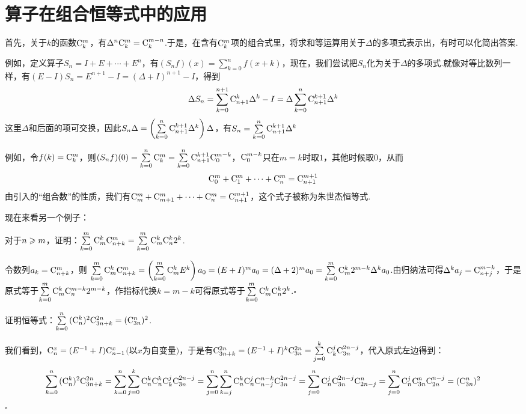 \documentclass[10pt]{article}
\newcommand*{\QEDB}{\hfill\ensuremath{\square}}  %
\newcommand*{\SL}{\sum\limits}
\newcommand*{\rC}{{\rm C}}
\numberwithin{equation}{section}
\begin{document}
\section{算子在组合恒等式中的应用} \label{s:1}
首先，关于$k$的函数$\rC_k^m$，有$\Delta^n \rC_k^m = \rC_k^{m-n}$.于是，在含有$\rC_k^m$项的组合式里，将求和等运算用关于$\Delta$的多项式表示出，有时可以化简出答案.
\par 例如，定义算子$S_n = I + E + \cdots + E^n$，有$(S_nf)(x) = \SL_{k=0}^{n}f(x+k)$，现在，我们尝试把$S_n$化为关于$\Delta$的多项式.就像对等比数列一样，有$(E-I)S_n = E^{n+1}-I = (\Delta + I)^{n+1} - I$，得到
\[
    \Delta S_n = \sum_{k=0}^{n+1}{\rC_{n+1}^k \Delta^k}-I = \Delta\sum_{k=0}^{n}{\rC_{n+1}^{k+1}\Delta^{k}}
\]
这里$\Delta$和后面的项可交换，因此$S_n\Delta = \left(\SL_{k=0}^{n}{\rC_{n+1}^{k+1}}\Delta^k\right)\Delta$，有$S_n = \SL_{k=0}^{n}{\rC_{n+1}^{k+1}}\Delta^k$
\par 例如，令$f(k) = \rC_{k}^{m}$，则$(S_nf)(0) = \SL_{k=0}^{n}{\rC_{k}^{m}} = \SL_{k=0}^{n}{\rC_{n+1}^{k+1}\rC_{0}^{m-k}}$，$\rC_{0}^{m-k}$只在$m = k$时取$1$，其他时候取$0$，从而
$$
\rC_{0}^{m} + \rC_{1}^{m} + \cdots + \rC_{n}^{m} = \rC_{n+1}^{m+1}
$$
由引入的“组合数”的性质，我们有$\rC_{m}^{m} + \rC_{m+1}^{m} + \cdots + \rC_{n}^{m} = \rC_{n+1}^{m+1}$，这个式子被称为{\zhht 朱世杰恒等式}.
\par 现在来看另一个例子：
\begin{LT}
    对于$n \geqslant m$，证明：$\SL_{k=0}^{m}{\rC_{m}^{k}\rC_{n+k}^m} = \SL_{k=0}^{m}{\rC_{m}^k \rC_n^k2^k}$.
\end{LT}
\begin{ZM}
令数列$a_k = \rC_{n+k}^m$，则 $\SL_{k=0}^{m}{\rC_{m}^{k}\rC_{n+k}^m} = \left(\SL_{k=0}^{m}{\rC_{m}^{k}E^k}\right)a_0 = (E+I)^ma_0 = (\Delta+2)^ma_0 = \SL_{k=0}^{m}{\rC_{m}^{k}2^{m-k}\Delta^k}a_0$.由归纳法可得$\Delta^ka_j = \rC_{n+j}^{m-k}$，于是原式等于$\SL_{k=0}^{m}{\rC_{m}^k\rC_{n}^{m-k}2^{m-k}}$，作指标代换$k = m-k$可得原式等于$\SL_{k=0}^{m}\rC_{m}^{k}\rC_{n}^{k}2^k$.\QEDB
\end{ZM}
\begin{LT}
    证明恒等式：$\SL_{k=0}^{n}{(\rC_n^k)^2\rC_{3n+k}^{2n}} = (\rC_{3n}^n)^2$.
\end{LT}
\begin{ZM}
    我们看到，$\rC_{n}^{x} = (E^{-1}+I)\rC_{n-1}^{x}$$($以$x$为自变量$)$，于是有$\rC_{3n+k}^{2n} = (E^{-1}+I)^{k}\rC_{3n}^{2n} = \SL_{j=0}^{k}{\rC_{k}^j\rC_{3n}^{2n-j}}$，代入原式左边得到：
    \[
        \sum_{k=0}^{n}{(\rC_n^k)^2\rC_{3n+k}^{2n}} = \sum_{k=0}^{n}\sum_{j=0}^{k}{\rC_n^k\rC_{n}^k\rC_{k}^{j}\rC_{3n}^{2n-j}} = \sum_{j=0}^{n}\sum_{k=j}^{n}{\rC_{n}^{k}\rC_{n}^{j}\rC_{n-j}^{n-k}\rC_{3n}^{2n-j}} = \sum_{j=0}^{n}{\rC_{n}^{j}\rC_{3n}^{2n-j}\rC_{2n-j}^{n}} = \sum_{j=0}^{n}{\rC_{n}^j\rC_{3n}^{n}\rC_{2n}^{n-j}} = (\rC_{3n}^n)^2
    \]
    \QEDB
\end{ZM}
\end{document}

